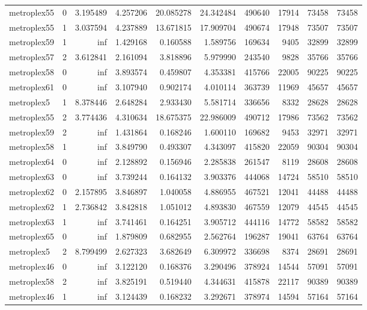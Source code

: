 \begin{longtable}{|l|r|r|r|r|r|r|r|r|r|}
metroplex55 & 0 & 3.195489 & 4.257206 & 20.085278 & 24.342484 & 490640 & 17914 & 73458 & 73458 \\
metroplex55 & 1 & 3.037594 & 4.237889 & 13.671815 & 17.909704 & 490674 & 17948 & 73507 & 73507 \\
metroplex59 & 1 & inf & 1.429168 & 0.160588 & 1.589756 & 169634 & 9405 & 32899 & 32899 \\
metroplex57 & 2 & 3.612841 & 2.161094 & 3.818896 & 5.979990 & 243540 & 9828 & 35766 & 35766 \\
metroplex58 & 0 & inf & 3.893574 & 0.459807 & 4.353381 & 415766 & 22005 & 90225 & 90225 \\
metroplex61 & 0 & inf & 3.107940 & 0.902174 & 4.010114 & 363739 & 11969 & 45657 & 45657 \\
metroplex5 & 1 & 8.378446 & 2.648284 & 2.933430 & 5.581714 & 336656 & 8332 & 28628 & 28628 \\
metroplex55 & 2 & 3.774436 & 4.310634 & 18.675375 & 22.986009 & 490712 & 17986 & 73562 & 73562 \\
metroplex59 & 2 & inf & 1.431864 & 0.168246 & 1.600110 & 169682 & 9453 & 32971 & 32971 \\
metroplex58 & 1 & inf & 3.849790 & 0.493307 & 4.343097 & 415820 & 22059 & 90304 & 90304 \\
metroplex64 & 0 & inf & 2.128892 & 0.156946 & 2.285838 & 261547 & 8119 & 28608 & 28608 \\
metroplex63 & 0 & inf & 3.739244 & 0.164132 & 3.903376 & 444068 & 14724 & 58510 & 58510 \\
metroplex62 & 0 & 2.157895 & 3.846897 & 1.040058 & 4.886955 & 467521 & 12041 & 44488 & 44488 \\
metroplex62 & 1 & 2.736842 & 3.842818 & 1.051012 & 4.893830 & 467559 & 12079 & 44545 & 44545 \\
metroplex63 & 1 & inf & 3.741461 & 0.164251 & 3.905712 & 444116 & 14772 & 58582 & 58582 \\
metroplex65 & 0 & inf & 1.879809 & 0.682955 & 2.562764 & 196287 & 19041 & 63764 & 63764 \\
metroplex5 & 2 & 8.799499 & 2.627323 & 3.682649 & 6.309972 & 336698 & 8374 & 28691 & 28691 \\
metroplex46 & 0 & inf & 3.122120 & 0.168376 & 3.290496 & 378924 & 14544 & 57091 & 57091 \\
metroplex58 & 2 & inf & 3.825191 & 0.519440 & 4.344631 & 415878 & 22117 & 90389 & 90389 \\
metroplex46 & 1 & inf & 3.124439 & 0.168232 & 3.292671 & 378974 & 14594 & 57164 & 57164 \\

\end{longtable}
